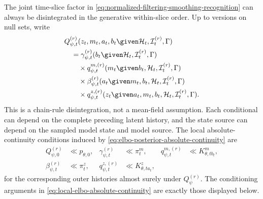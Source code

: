 The joint time-slice factor in \cref{eq:normalized-filtering-smoothing-recognition} can always be disintegrated in the generative within-slice order. Up to versions on null sets, write
\begin{equation}
\begin{aligned}
&Q_{\psi,t}^{(r)}
(z_t,m_t,a_t,b_t\given
\mathcal H_t,\mathcal I_t^{(r)},\Gamma)\\
&\quad=
\gamma_{\psi,t}^{(r)}
(b_t\given\mathcal H_t,\mathcal I_t^{(r)},\Gamma)\\
&\qquad\times
q_{\psi,t}^{m,(r)}
(m_t\given b_t,\mathcal H_t,\mathcal I_t^{(r)},\Gamma)\\
&\qquad\times
\beta_{\psi,t}^{(r)}
(a_t\given m_t,b_t,\mathcal H_t,\mathcal I_t^{(r)},\Gamma)\\
&\qquad\times
q_{\psi,t}^{z,(r)}
(z_t\given a_t,m_t,b_t,\mathcal H_t,
\mathcal I_t^{(r)},\Gamma).
\end{aligned}
\label{eq:structured-slice-disintegration}
\end{equation}
This is a chain-rule disintegration, not a mean-field assumption. Each conditional can depend on the complete preceding latent history, and the state source can depend on the sampled model state and model source. The local absolute-continuity conditions induced by \cref{eq:elbo-posterior-absolute-continuity} are
\begin{equation}
\begin{aligned}
Q_{\psi,0}^{(r)}&\ll p_{\theta,0},
&\gamma_{\psi,t}^{(r)}&\ll\pi_t^m,
&q_{\psi,t}^{m,(r)}&\ll K^m_{\theta,tb_t},\\
\beta_{\psi,t}^{(r)}&\ll\pi_t^z,
&q_{\psi,t}^{z,(r)}&\ll K^z_{\theta,ta_t},
\end{aligned}
\label{eq:local-elbo-absolute-continuity}
\end{equation}
for the corresponding outer histories almost surely under $Q_\psi^{(r)}$. The conditioning arguments in \cref{eq:local-elbo-absolute-continuity} are exactly those displayed below.

